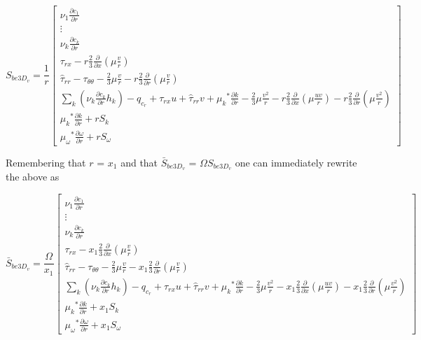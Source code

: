 \begin{displaymath}
	S_{be3D_v} = \frac{1}{r}\left[ \begin{array}{c}
		\nu_1 \frac{\partial c_1}{\partial r} \\
		\vdots \\
		\nu_k \frac{\partial c_k}{\partial r} \\
		\tau_{rx} - r\frac{2}{3}\frac{\partial}{\partial x}(\mu \frac{v}{r}) \\
		\hat{ \tau}_{rr} -\tau_{\theta \theta} - \frac{2}{3}\mu \frac{v}{r} 
		- r\frac{2}{3}\frac{\partial}{\partial r}(\mu \frac{v}{r}) \\
		\sum_k (\nu_k \frac{\partial c_k}{\partial r}h_k) - q_{c_r} + \tau_{rx}u 
		+ \hat{ \tau}_{rr}v + {\mu_k}^* \frac{\partial k}{\partial r} - \frac{2}{3} \mu \frac{v^2}{r}
			- r\frac{2}{3} \frac{\partial}{\partial x}(\mu \frac{uv}{r})
			- r\frac{2}{3} \frac{\partial}{\partial r}(\mu \frac{v^2}{r}) \\
		{\mu_k}^* \frac{\partial k}{\partial r} + rS_k\\
		{\mu_\omega}^* \frac{\partial \omega}{\partial r} + rS_\omega
		   \end{array}
	    \right]
\end{displaymath}

	Remembering that $r$ = $x_1$ and that $\bar{S}_{be3D_v}$ = $\Omega S_{be3D_v}$ one can immediately
rewrite the above as

\begin{equation}
	\bar{S}_{be3D_v} = \frac{\Omega}{x_1}\left[ \begin{array}{c}
		\nu_1 \frac{\partial c_1}{\partial r} \\
		\vdots \\
		\nu_k \frac{\partial c_k}{\partial r} \\
		\tau_{rx} - x_1\frac{2}{3}\frac{\partial}{\partial x}(\mu \frac{v}{r}) \\
		\hat{ \tau}_{rr} -\tau_{\theta \theta} - \frac{2}{3}\mu \frac{v}{r} 
		- x_1\frac{2}{3}\frac{\partial}{\partial r}(\mu \frac{v}{r}) \\
		\sum_k (\nu_k \frac{\partial c_k}{\partial r}h_k) - q_{c_r} + \tau_{rx}u 
		+ \hat{ \tau}_{rr}v + {\mu_k}^* \frac{\partial k}{\partial r} - \frac{2}{3} \mu \frac{v^2}{r}
			- x_1\frac{2}{3} \frac{\partial}{\partial x}(\mu \frac{uv}{r})
			- x_1\frac{2}{3} \frac{\partial}{\partial r}(\mu \frac{v^2}{r}) \\
		{\mu_k}^* \frac{\partial k}{\partial r} + x_1S_k\\
		{\mu_\omega}^* \frac{\partial \omega}{\partial r} + x_1S_\omega
		   \end{array}
	    \right]
\label{eqn:beginHvbar}
\end{equation}


